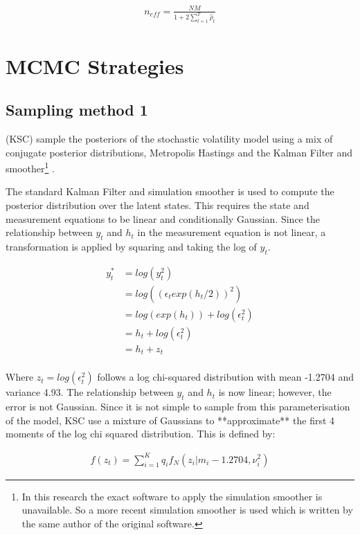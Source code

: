 \documentclass[12pt, a4paper]{article}
\begin{document}
            $$
            \begin{aligned}
                n_{eff} = \frac{NM}{1+2 \sum_{t=1}^T \hat{\rho}_t}
            \end{aligned}
            $$

\section{MCMC Strategies}

    \subsection{Sampling method 1}
        (KSC) sample the posteriors of the stochastic volatility model using a mix of conjugate posterior distributions, Metropolis Hastings and the Kalman Filter and smoother\footnote{In this research the exact software to apply the simulation smoother is unavailable. So a more recent simulation smoother is used which is written by the same author of the original software.} \citep{dejong1995}.

        The standard Kalman Filter and simulation smoother is used to compute the posterior distribution over the latent states. This requires the state and measurement equations to be linear and conditionally Gaussian. Since the relationship between $y_t$ and $h_t$ in the measurement equation is not linear, a transformation is applied by squaring and taking the log of $y_t$.

        $$
        \begin{aligned}
        y_t^{*} &= log(y_t^2) \\ 
        &= log((\epsilon_t exp(h_t/2))^2) \\
        &=  log(exp(h_t)) + log(\epsilon_t^2) \\
        &= h_t + log(\epsilon_t^2)  \\
        &= h_t + z_t \\
        \end{aligned}
        $$

        Where $z_t = log(\epsilon_t^2)$ follows a log chi-squared distribution with mean -1.2704 and variance 4.93. The relationship between $y_t$ and $h_t$ is now linear; however, the error is not Gaussian. Since it is not simple to sample from this parameterisation of the model, KSC use a mixture of Gaussians to **approximate** the first 4 moments of the log chi squared distribution. This is defined by:

        $$
        \begin{aligned}
        f(z_t) = \sum_{i=1}^{K} q_if_N(z_i|m_i-1.2704, \nu_i^2)
        \end{aligned}
        $$
\end{document}
